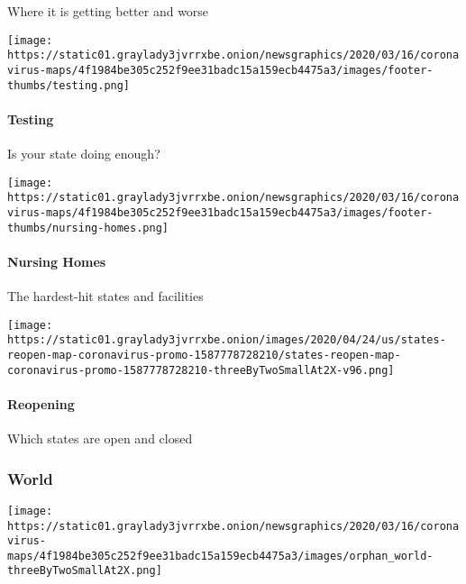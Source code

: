 Where it is getting better and worse

\href{https://www.nytimes3xbfgragh.onion/interactive/2020/us/coronavirus-testing.html}{}

\texttt{[image: https://static01.graylady3jvrrxbe.onion/newsgraphics/2020/03/16/coronavirus-maps/4f1984be305c252f9ee31badc15a159ecb4475a3/images/footer-thumbs/testing.png]}

\hypertarget{testing}{%
\paragraph{Testing}\label{testing}}

Is your state doing enough?

\href{https://www.nytimes3xbfgragh.onion/interactive/2020/us/coronavirus-nursing-homes.html}{}

\texttt{[image: https://static01.graylady3jvrrxbe.onion/newsgraphics/2020/03/16/coronavirus-maps/4f1984be305c252f9ee31badc15a159ecb4475a3/images/footer-thumbs/nursing-homes.png]}

\hypertarget{nursing-homes}{%
\paragraph{Nursing Homes}\label{nursing-homes}}

The hardest-hit states and facilities

\href{https://www.nytimes3xbfgragh.onion/interactive/2020/us/states-reopen-map-coronavirus.html}{}

\texttt{[image: https://static01.graylady3jvrrxbe.onion/images/2020/04/24/us/states-reopen-map-coronavirus-promo-1587778728210/states-reopen-map-coronavirus-promo-1587778728210-threeByTwoSmallAt2X-v96.png]}

\hypertarget{reopening}{%
\paragraph{Reopening}\label{reopening}}

Which states are open and closed

\hypertarget{world}{%
\subsubsection{World}\label{world}}

\href{https://www.nytimes3xbfgragh.onion/interactive/2020/world/coronavirus-maps.html}{}

\texttt{[image: https://static01.graylady3jvrrxbe.onion/newsgraphics/2020/03/16/coronavirus-maps/4f1984be305c252f9ee31badc15a159ecb4475a3/images/orphan\_world-threeByTwoSmallAt2X.png]}

